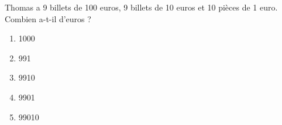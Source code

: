  Thomas a 9 billets de 100 euros, 9 billets de 10 euros et 10 pièces de 1 euro.
Combien a-t-il d'euros ?
\begin{multicols}{5}
  \begin{enumerate}[A/]
  \item 1000
  \item 991
  \item 9910
  \item 9901
  \item 99010
  \end{enumerate}
\end{multicols}